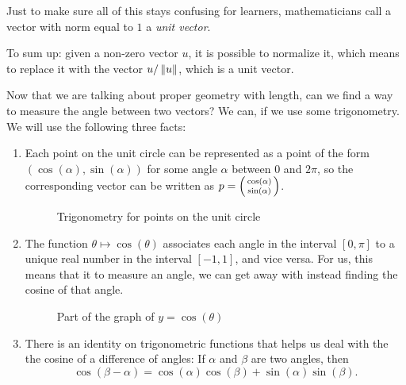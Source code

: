 \documentclass[00-livre-main.tex]{subfiles}
\begin{document}
Just to make sure all of this stays confusing for learners, mathematicians call a vector with norm equal to $1$ a \emph{unit vector}.

To sum up: given a non-zero vector $u$, it is possible to normalize it, which means to replace it with the vector $u/\left\|u\right\|$, which is a unit vector.


Now that we are talking about proper geometry with length, can we find a way to measure the angle between two vectors? We can, if we use some trigonometry. We will use the following three facts:
\begin{enumerate}
\item Each point on the unit circle can be represented as a point of the form $(\cos(\alpha), \sin(\alpha))$ for some angle $\alpha$ between $0$ and $2\pi$, so the corresponding vector can be written as $p = \left(\begin{smallmatrix} \cos(\alpha) \\ \sin(\alpha) \end{smallmatrix}\right)$.


\begin{figure}[h]
\centering
{}
\caption{Trigonometry for points on the unit circle}
\label{fig:unit-circle}
\end{figure}


\item The function $\theta \mapsto \cos(\theta)$ associates each angle in the interval
$[0,\pi]$ to a unique real number in the interval $[-1,1]$, and vice versa. For us, this means that it to measure an angle, we can get away with instead finding the cosine of that angle.

\begin{figure}[h]
\centering
{}
\caption{Part of the graph of $y=\cos(\theta)$}
\label{fig:cos-graph}
\end{figure}

\item There is an identity on trigonometric functions that helps us deal with the the cosine of a difference of angles: If $\alpha$ and $\beta$ are two angles, then
\[
\cos(\beta-\alpha) = \cos(\alpha)\cos(\beta) + \sin(\alpha)\sin(\beta).
\]
\end{enumerate}
\end{document}
